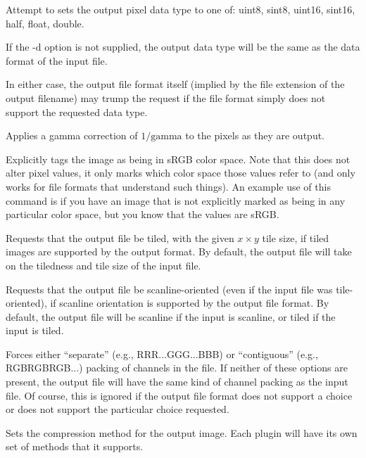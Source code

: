 Attempt to sets the output pixel data type to one of: {\cf uint8}, 
{\cf sint8}, {\cf uint16}, {\cf sint16}, {\cf half}, {\cf float}, 
{\cf double}.

If the {\cf -d} option is not supplied, the output data type will
be the same as the data format of the input file.

In either case, the output file format itself (implied by the file
extension of the output filename) may trump the request if the file
format simply does not support the requested data type.
\apiend

Applies a gamma correction of $1/\mathrm{gamma}$ to the pixels as they
are output.
\apiend

Explicitly tags the image as being in sRGB color space.  Note that this
does not alter pixel values, it only marks which color space those
values refer to (and only works for file formats that understand such
things).  An example use of this command is if you have an image 
that is not explicitly marked as being in any particular color space,
but you know that the values are sRGB.
\apiend

Requests that the output file be tiled, with the given $x \times y$ 
tile size, if tiled images are supported by the output format.
By default, the output file will take on the tiledness and tile size
of the input file.
\apiend

Requests that the output file be scanline-oriented (even if the input
file was tile-oriented), if scanline orientation is supported by the
output file format.  By default, the output file will be scanline
if the input is scanline, or tiled if the input is tiled.
\apiend

Forces either ``separate'' (e.g., RRR...GGG...BBB) or ``contiguous''
(e.g., RGBRGBRGB...) packing of channels in the file.  If neither
of these options are present, the output file will have the same
kind of channel packing as the input file.  Of course, this is ignored
if the output file format does not support a choice or does not support
the particular choice requested.
\apiend

Sets the compression method for the output image.  Each \ImageOutput
plugin will have its own set of methods that it supports.

